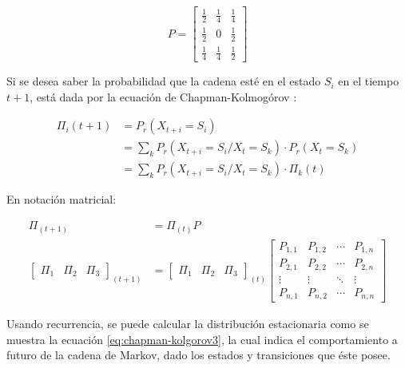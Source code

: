 \begin{equation} \label{eq:ejCadenaMarkov}
	P =
	\begin{bmatrix}
		\frac{1}{2} & \frac{1}{4} & \frac{1}{4} \\
		\frac{1}{2} & 0 & \frac{1}{2} \\
		\frac{1}{4} & \frac{1}{4} & \frac{1}{2}
	\end{bmatrix}	
\end{equation}

Si se desea saber la probabilidad que la cadena esté en el estado $S_i$ en el tiempo $t+1$, está dada por la ecuación de Chapman-Kolmogórov \citep{Papoulis1984}:

\begin{equation} \label{eq:chapman-kolmogorov1}
\begin{split}
	\Pi_{i} (t+1) &= P_r(X_{t+i}=S_i) \\
				  &= \sum _{k} P_r(X_{t+i} = S_i / X_t = S_k)·P_r(X_t = S_k)\\
				  &= \sum _{k} P_r(X_{t+i} = S_i / X_t = S_k)·\Pi_{k} (t)
\end{split}	
\end{equation}

En notación matricial:

\begin{equation} \label{eq:chapman-kolgorov2}
\begin{split}
	\Pi_{(t+1)} &= \Pi_{(t)}P\\
	\begin{bmatrix}
		\Pi_1 & \Pi_2 & \Pi_3
	\end{bmatrix} _{(t+1)}
	&= \begin{bmatrix}
		\Pi_1 & \Pi_2 & \Pi_3
	\end{bmatrix} _{(t)}
	\begin{bmatrix}
		P_{1,1} & P_{1,2} & \cdots & P_{1,n} \\
		P_{2,1} & P_{2,2} & \cdots & P_{2,n} \\
		\vdots  & \vdots  & \ddots & \vdots  \\
		P_{n,1} & P_{n,2} & \cdots & P_{n,n}
	\end{bmatrix}
\end{split}
\end{equation}

Usando recurrencia, se puede calcular la distribución estacionaria como se muestra la ecuación \ref{eq:chapman-kolgorov3}, la cual indica el comportamiento a futuro de la cadena de Markov, dado los estados y transiciones que éste posee.

